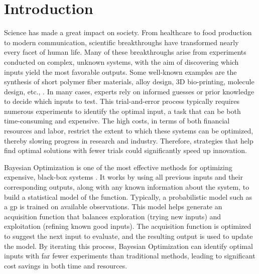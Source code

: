 \chapter{Introduction} %

\label{chap:introduction} %


\newcommand{\keyword}[1]{\textbf{#1}}
\newcommand{\tabhead}[1]{\textbf{#1}}
\newcommand{\code}[1]{\texttt{#1}}
\newcommand{\file}[1]{\texttt{\bfseries#1}}
\newcommand{\option}[1]{\texttt{\itshape#1}}

Science has made a great impact on society. From healthcare to food production to modern communication, scientific breakthroughs have transformed nearly every facet of human life. Many of these breakthroughs arise from experiments conducted on complex, unknown systems, with the aim of discovering which inputs yield the most favorable outputs. Some well-known examples are the synthesis of short polymer fiber materials, alloy design, 3D bio-printing, molecule design, etc., \citep{greenhill2020bayesian, shahriari2015taking}. In many cases, experts rely on informed guesses or prior knowledge to decide which inputs to test. This trial-and-error process typically requires numerous experiments to identify the optimal input, a task that can be both time-consuming and expensive. The high costs, in terms of both financial resources and labor, restrict the extent to which these systems can be optimized, thereby slowing progress in research and industry. Therefore, strategies that help find optimal solutions with fewer trials could significantly speed up innovation.

Bayesian Optimization is one of the most effective methods for optimizing expensive, black-box systems \citep{mockus1978application, streltsov1999non}. It works by using all previous inputs and their corresponding outputs, along with any known information about the system, to build a statistical model of the function. Typically, a probabilistic model such as a \acf{gp} is trained on available observations. This model helps generate an acquisition function that balances exploration (trying new inputs) and exploitation (refining known good inputs). The acquisition function is optimized to suggest the next input to evaluate, and the resulting output is used to update the model. By iterating this process, Bayesian Optimization can identify optimal inputs with far fewer experiments than traditional methods, leading to significant cost savings in both time and resources. 

